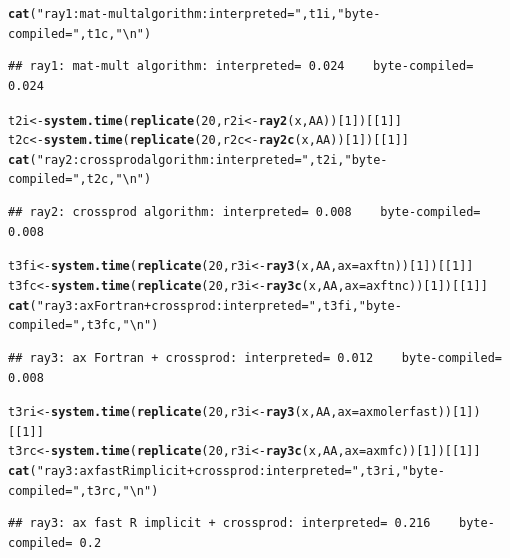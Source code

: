 \documentclass[10pt]{article}\usepackage[]{graphicx}\usepackage[]{color}
\makeatletter
\newcommand{\hlnum}[1]{\textcolor[rgb]{0.686,0.059,0.569}{#1}}%
\newcommand{\hlstr}[1]{\textcolor[rgb]{0.192,0.494,0.8}{#1}}%
\newcommand{\hlstd}[1]{\textcolor[rgb]{0.345,0.345,0.345}{#1}}%
\newcommand{\hlkwb}[1]{\textcolor[rgb]{0.69,0.353,0.396}{#1}}%
\newcommand{\hlkwc}[1]{\textcolor[rgb]{0.333,0.667,0.333}{#1}}%
\newcommand{\hlkwd}[1]{\textcolor[rgb]{0.737,0.353,0.396}{\textbf{#1}}}%
\newenvironment{kframe}{%
 \def\at@end@of@kframe{}%
 \ifinner\ifhmode%
  \def\at@end@of@kframe{\end{minipage}}%
  \begin{minipage}{\columnwidth}%
 \fi\fi%
 \def\FrameCommand##1{\hskip\@totalleftmargin \hskip-\fboxsep
 \colorbox{shadecolor}{##1}\hskip-\fboxsep
     \hskip-\linewidth \hskip-\@totalleftmargin \hskip\columnwidth}%
 \MakeFramed {\advance\hsize-\width
   \@totalleftmargin\z@ \linewidth\hsize
   \@setminipage}}%
 {\par\unskip\endMakeFramed%
 \at@end@of@kframe}
\newenvironment{knitrout}{}{} %
\makeatother
\begin{document}
\begin{knitrout}
\begin{kframe}
\begin{alltt}
  \hlkwd{cat}\hlstd{(}\hlstr{"ray1: mat-mult algorithm: interpreted="}\hlstd{,t1i,}\hlstr{"   byte-compiled="}\hlstd{,t1c,}\hlstr{"\textbackslash{}n"}\hlstd{)}
\end{alltt}
\begin{verbatim}
## ray1: mat-mult algorithm: interpreted= 0.024    byte-compiled= 0.024
\end{verbatim}
\begin{alltt}
  \hlstd{t2i}\hlkwb{<-}\hlkwd{system.time}\hlstd{(}\hlkwd{replicate}\hlstd{(}\hlnum{20}\hlstd{,r2i}\hlkwb{<-}\hlkwd{ray2}\hlstd{(x, AA))[}\hlnum{1}\hlstd{])[[}\hlnum{1}\hlstd{]]}
  \hlstd{t2c}\hlkwb{<-}\hlkwd{system.time}\hlstd{(}\hlkwd{replicate}\hlstd{(}\hlnum{20}\hlstd{,r2c}\hlkwb{<-}\hlkwd{ray2c}\hlstd{(x, AA))[}\hlnum{1}\hlstd{])[[}\hlnum{1}\hlstd{]]}
  \hlkwd{cat}\hlstd{(}\hlstr{"ray2: crossprod algorithm: interpreted="}\hlstd{,t2i,}\hlstr{"   byte-compiled="}\hlstd{,t2c,}\hlstr{"\textbackslash{}n"}\hlstd{)}
\end{alltt}
\begin{verbatim}
## ray2: crossprod algorithm: interpreted= 0.008    byte-compiled= 0.008
\end{verbatim}
\begin{alltt}
  \hlstd{t3fi}\hlkwb{<-}\hlkwd{system.time}\hlstd{(}\hlkwd{replicate}\hlstd{(}\hlnum{20}\hlstd{,r3i}\hlkwb{<-}\hlkwd{ray3}\hlstd{(x, AA,} \hlkwc{ax}\hlstd{=axftn))[}\hlnum{1}\hlstd{])[[}\hlnum{1}\hlstd{]]}
  \hlstd{t3fc}\hlkwb{<-}\hlkwd{system.time}\hlstd{(}\hlkwd{replicate}\hlstd{(}\hlnum{20}\hlstd{,r3i}\hlkwb{<-}\hlkwd{ray3c}\hlstd{(x, AA,} \hlkwc{ax}\hlstd{=axftnc))[}\hlnum{1}\hlstd{])[[}\hlnum{1}\hlstd{]]}
  \hlkwd{cat}\hlstd{(}\hlstr{"ray3: ax Fortran + crossprod: interpreted="}\hlstd{,t3fi,}\hlstr{"   byte-compiled="}\hlstd{,t3fc,}\hlstr{"\textbackslash{}n"}\hlstd{)}
\end{alltt}
\begin{verbatim}
## ray3: ax Fortran + crossprod: interpreted= 0.012    byte-compiled= 0.008
\end{verbatim}
\begin{alltt}
  \hlstd{t3ri}\hlkwb{<-}\hlkwd{system.time}\hlstd{(}\hlkwd{replicate}\hlstd{(}\hlnum{20}\hlstd{,r3i}\hlkwb{<-}\hlkwd{ray3}\hlstd{(x, AA,} \hlkwc{ax}\hlstd{=axmolerfast))[}\hlnum{1}\hlstd{])[[}\hlnum{1}\hlstd{]]}
  \hlstd{t3rc}\hlkwb{<-}\hlkwd{system.time}\hlstd{(}\hlkwd{replicate}\hlstd{(}\hlnum{20}\hlstd{,r3i}\hlkwb{<-}\hlkwd{ray3c}\hlstd{(x, AA,} \hlkwc{ax}\hlstd{=axmfc))[}\hlnum{1}\hlstd{])[[}\hlnum{1}\hlstd{]]}
  \hlkwd{cat}\hlstd{(}\hlstr{"ray3: ax fast R implicit + crossprod: interpreted="}\hlstd{,t3ri,}\hlstr{"   byte-compiled="}\hlstd{,t3rc,}\hlstr{"\textbackslash{}n"}\hlstd{)}
\end{alltt}
\begin{verbatim}
## ray3: ax fast R implicit + crossprod: interpreted= 0.216    byte-compiled= 0.2
\end{verbatim}
\end{kframe}
\end{knitrout}
\end{document}
